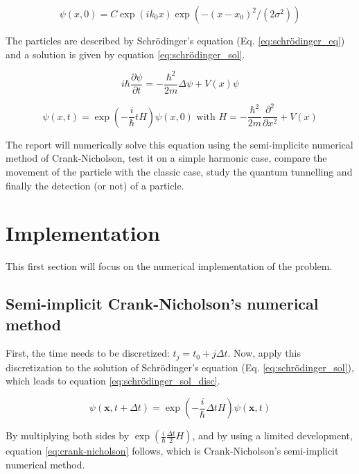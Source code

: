 \documentclass[a4paper,12pt,twoside]{article}
\newcommand{\mbf}[1]{\mathbf{#1}} %
\newcommand{\bracket}[1]{\left(#1\right)}
\newcommand{\lapl}[1]{\Delta#1}
\begin{document}
  \begin{equation}
    \psi(x,0) = C\exp(ik_0x)\exp(-(x-x_0)^2/(2\sigma^2))
    \label{eq:wave_packet}
  \end{equation}

  The particles are described by Schrödinger's equation (Eq. \eqref{eq:schrödinger_eq}) and a solution is given by equation \eqref{eq:schrödinger_sol}.

  \begin{equation}
    i\hbar\frac{\partial\psi}{\partial t} = -\frac{\hbar^2}{2m}\lapl{\psi} + V(x)\psi
    \label{eq:schrödinger_eq}
  \end{equation}

  \begin{equation}
    \psi(x,t) = \exp\bracket{-\frac{i}{\hbar}tH}\psi(x,0)\text{ with }H=-\frac{\hbar^2}{2m}\frac{\partial^2}{\partial x^2} + V(x)
    \label{eq:schrödinger_sol}
  \end{equation}

  The report will numerically solve this equation using the semi-implicite numerical method of Crank-Nicholson, test it on a simple harmonic case, compare the movement of the particle with the classic case, study the quantum tunnelling and finally the detection (or not) of a particle.

\newpage
\section{Implementation}\label{sec:impl}
  This first section will focus on the numerical implementation of the problem.

  \subsection{Semi-implicit Crank-Nicholson's numerical method}
    First, the time needs to be discretized: $t_j = t_0 + j\Delta t$.
    Now, apply this discretization to the solution of Schrödinger's equation (Eq. \eqref{eq:schrödinger_sol}), which leads to equation \eqref{eq:schrödinger_sol_disc}.

    \begin{equation}
      \psi(\mbf{x}, t + \Delta t) = \exp\bracket{-\frac{i}{\hbar}\Delta t H}\psi(\mbf{x}, t)
      \label{eq:schrödinger_sol_disc}
    \end{equation}

    By multiplying both sides by $\exp\bracket{\frac{i}{\hbar}\frac{\Delta t}{2}H}$, and by using a limited development, equation \eqref{eq:crank-nicholson} follows, which is Crank-Nicholson's semi-implicit numerical method.
\end{document}
